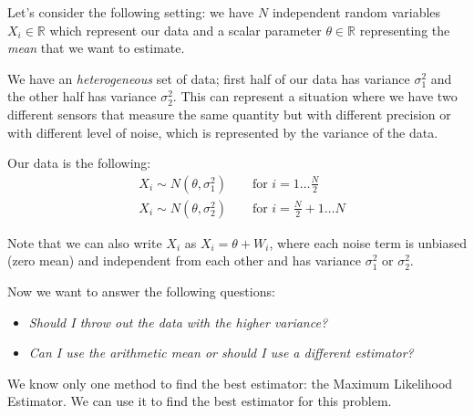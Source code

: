 Let's consider the following setting: we have $N$ independent random variables $X_i \in \mathbb{R}$ which represent our data and a scalar parameter $\theta \in \mathbb{R}$ representing the \textit{mean} that we want to estimate.

We have an \textit{heterogeneous} set of data; first half of our data has variance $\sigma_1^2$ and the other half has variance $\sigma_2^2$. This can represent a situation where we have two different sensors that measure the same quantity but with different precision or with different level of noise, which is represented by the variance of the data.

Our data is the following:
\begin{align*}
     & X_i \sim N(\theta, \sigma_1^2) \qquad \text{for } i = 1 \dots \frac{N}{2}     \\
     & X_i \sim N(\theta, \sigma_2^2) \qquad \text{for } i = \frac{N}{2} + 1 \dots N
\end{align*}

Note that we can also write $X_i$ as $X_i = \theta + W_i$, where each noise term is unbiased (zero mean) and independent from each other and has variance $\sigma_1^2$ or $\sigma_2^2$.

Now we want to answer the following questions:
\begin{itemize}
    \item \textit{Should I throw out the data with the higher variance?}
    \item \textit{Can I use the arithmetic mean or should I use a different estimator?}
\end{itemize}

We know only one method to find the best estimator: the Maximum Likelihood Estimator. We can use it to find the best estimator for this problem.

